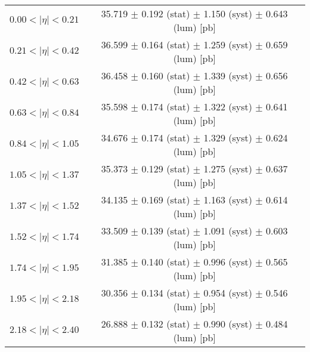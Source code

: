 \begin{tabular}{lc}
\hline
$0.00 < |\eta| <0.21$          & 35.719 $\pm$ 0.192 (stat) $\pm$ 1.150 (syst) $\pm$ 0.643 (lum) [pb]  \\
$0.21 < |\eta| <0.42$          & 36.599 $\pm$ 0.164 (stat) $\pm$ 1.259 (syst) $\pm$ 0.659 (lum) [pb]  \\
$0.42 < |\eta| <0.63$          & 36.458 $\pm$ 0.160 (stat) $\pm$ 1.339 (syst) $\pm$ 0.656 (lum) [pb]  \\
$0.63 < |\eta| <0.84$          & 35.598 $\pm$ 0.174 (stat) $\pm$ 1.322 (syst) $\pm$ 0.641 (lum) [pb]  \\
$0.84 < |\eta| <1.05$          & 34.676 $\pm$ 0.174 (stat) $\pm$ 1.329 (syst) $\pm$ 0.624 (lum) [pb]  \\
$1.05 < |\eta| <1.37$          & 35.373 $\pm$ 0.129 (stat) $\pm$ 1.275 (syst) $\pm$ 0.637 (lum) [pb]  \\
$1.37 < |\eta| <1.52$          & 34.135 $\pm$ 0.169 (stat) $\pm$ 1.163 (syst) $\pm$ 0.614 (lum) [pb]  \\
$1.52 < |\eta| <1.74$          & 33.509 $\pm$ 0.139 (stat) $\pm$ 1.091 (syst) $\pm$ 0.603 (lum) [pb]  \\
$1.74 < |\eta| <1.95$          & 31.385 $\pm$ 0.140 (stat) $\pm$ 0.996 (syst) $\pm$ 0.565 (lum) [pb]  \\
$1.95 < |\eta| <2.18$          & 30.356 $\pm$ 0.134 (stat) $\pm$ 0.954 (syst) $\pm$ 0.546 (lum) [pb]  \\
$2.18 < |\eta| <2.40$          & 26.888 $\pm$ 0.132 (stat) $\pm$ 0.990 (syst) $\pm$ 0.484 (lum) [pb]  \\
\hline
\end{tabular}
